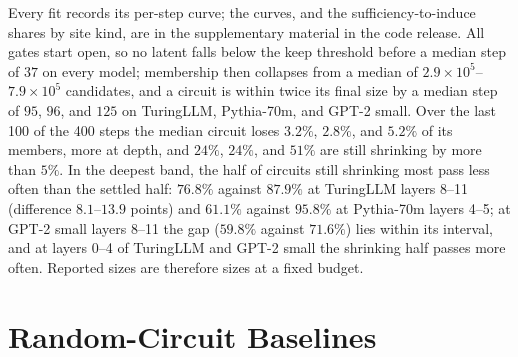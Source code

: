 \documentclass[10pt]{article}
\begin{document}
Every fit records its per-step curve; the curves, and the sufficiency-to-induce shares by site kind, are in the supplementary material in the code release.
All gates start open, so no latent falls below the keep threshold before a median step of $37$ on every model; membership then collapses from a median of $2.9 \times 10^{5}$--$7.9 \times 10^{5}$ candidates, and a circuit is within twice its final size by a median step of $95$, $96$, and $125$ on TuringLLM, Pythia-70m, and GPT-2 small.
Over the last 100 of the 400 steps the median circuit loses $3.2\%$, $2.8\%$, and $5.2\%$ of its members, more at depth, and $24\%$, $24\%$, and $51\%$ are still shrinking by more than $5\%$.
In the deepest band, the half of circuits still shrinking most pass less often than the settled half: $76.8\%$ against $87.9\%$ at TuringLLM layers 8--11 (difference $8.1$--$13.9$ points) and $61.1\%$ against $95.8\%$ at Pythia-70m layers 4--5; at GPT-2 small layers 8--11 the gap ($59.8\%$ against $71.6\%$) lies within its interval, and at layers 0--4 of TuringLLM and GPT-2 small the shrinking half passes more often.
Reported sizes are therefore sizes at a fixed budget.

\section{Random-Circuit Baselines}
\label{app:nulls}
\end{document}
